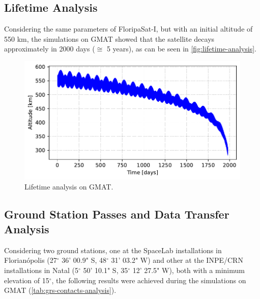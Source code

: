 \subsection{Lifetime Analysis}

Considering the same parameters of FloripaSat-I, but with an initial altitude of 550 km, the simulations on GMAT showed that the satellite decays approximately in 2000 days ($\cong$ 5 years), as can be seen in \autoref{fig:lifetime-analysis}.

\begin{figure}[!ht]
    \begin{center}
        \includegraphics[width=\textwidth]{curves/lifetime.pdf}
        \caption{Lifetime analysis on GMAT.}
        \label{fig:lifetime-analysis}
    \end{center}
\end{figure}

\subsection{Ground Station Passes and Data Transfer Analysis}

Considering two ground stations, one at the SpaceLab installations in Florianópolis (27$^{\circ}$ 36' 00.9" S, 48$^{\circ}$ 31' 03.2" W) and other at the INPE/CRN installations in Natal (5$^{\circ}$ 50' 10.1" S, 35$^{\circ}$ 12' 27.5" W), both with a minimum elevation of 15$^{\circ}$, the following results were achieved during the simulations on GMAT (\autoref{tab:grs-contacts-analysis}).

